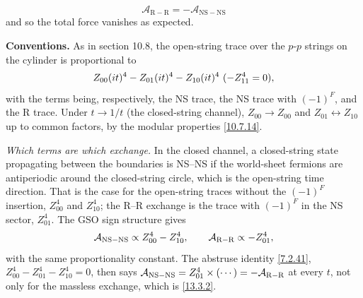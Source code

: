 \begin{equation}
	\mathcal{A}_{\mathrm{R-R}} = -\mathcal{A}_{\mathrm{NS-NS}} \label{13.3.2}
\end{equation}
and so the total force vanishes as expected.
\begin{tcolorbox}[breakable]
	\begin{remark}
		\textbf{Conventions.} As in section 10.8, the open-string trace over the $p$-$p$ strings on the cylinder is proportional to
		\begin{equation*}
			Z_{00}(\mi t)^4-Z_{01}(\mi t)^4-Z_{10}(\mi t)^4 \ (-Z_{11}^4=0),
		\end{equation*}
		with the terms being, respectively, the NS trace, the NS trace with $(-1)^F$, and the R trace. Under $t\to1/t$ (the closed-string channel), $Z_{00}\to Z_{00}$ and $Z_{01}\leftrightarrow Z_{10}$ up to common factors, by the modular properties \eqref{10.7.14}.

		\textit{Which terms are which exchange.} In the closed channel, a closed-string state propagating between the boundaries is NS--NS if the world-sheet fermions are antiperiodic around the closed-string circle, which is the open-string time direction. That is the case for the open-string traces without the $(-1)^F$ insertion, $Z_{00}^4$ and $Z_{10}^4$; the R--R exchange is the trace with $(-1)^F$ in the NS sector, $Z_{01}^4$. The GSO sign structure gives
		\begin{equation*}
			\mathcal A_{\rm NS-NS}\propto Z_{00}^4-Z_{10}^4,\qquad \mathcal A_{\rm R-R}\propto -Z_{01}^4 ,
		\end{equation*}
		with the same proportionality constant. The abstruse identity \eqref{7.2.41}, $Z_{00}^4-Z_{01}^4-Z_{10}^4=0$, then says $\mathcal A_{\rm NS-NS}=Z_{01}^4\times(\cdots)=-\mathcal A_{\rm R-R}$ at every $t$, not only for the massless exchange, which is \eqref{13.3.2}.
	\end{remark}
\end{tcolorbox}

